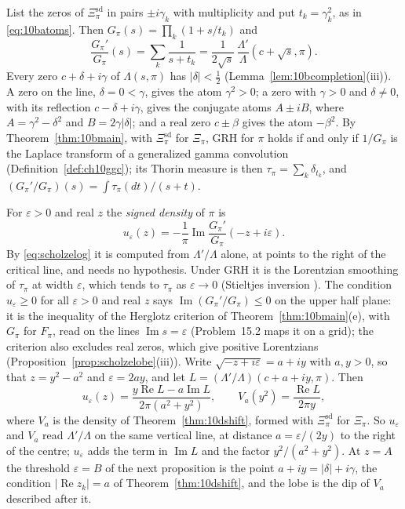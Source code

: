List the zeros of $\Xi^{\mathrm{sd}}_\pi$ in pairs $\pm i\gamma_k$ with multiplicity and put $t_k=\gamma_k^2$, as in \eqref{eq:10batoms}. Then $G_\pi(s)=\prod_k(1+s/t_k)$ and
\begin{equation}\label{eq:scholzelog}
\frac{G_\pi'}{G_\pi}(s)=\sum_k\frac1{s+t_k}=\frac1{2\sqrt s}\,\frac{\Lambda'}{\Lambda}(c+\sqrt s,\pi).
\end{equation}
Every zero $c+\delta+i\gamma$ of $\Lambda(s,\pi)$ has $|\delta|<\frac12$ (Lemma~\ref{lem:10bcompletion}(iii)). A zero on the line, $\delta=0<\gamma$, gives the atom $\gamma^2>0$; a zero with $\gamma>0$ and $\delta\ne0$, with its reflection $c-\delta+i\gamma$, gives the conjugate atoms $A\pm iB$, where $A=\gamma^2-\delta^2$ and $B=2\gamma|\delta|$; and a real zero $c\pm\beta$ gives the atom $-\beta^2$. By Theorem~\ref{thm:10bmain}, with $\Xi^{\mathrm{sd}}_\pi$ for $\Xi_\pi$, GRH for $\pi$ holds if and only if $1/G_\pi$ is the Laplace transform of a generalized gamma convolution (Definition~\ref{def:ch10ggc}); its Thorin measure is then $\tau_\pi=\sum_k\delta_{t_k}$, and $(G_\pi'/G_\pi)(s)=\int\tau_\pi(dt)/(s+t)$.

For $\varepsilon>0$ and real $z$ the \emph{signed density} of $\pi$ is
\[
u_\varepsilon(z)=-\frac1\pi\operatorname{Im}\frac{G_\pi'}{G_\pi}(-z+i\varepsilon).
\]
By \eqref{eq:scholzelog} it is computed from $\Lambda'/\Lambda$ alone, at points to the right of the critical line, and needs no hypothesis. Under GRH it is the Lorentzian smoothing of $\tau_\pi$ at width $\varepsilon$, which tends to $\tau_\pi$ as $\varepsilon\to0$ (Stieltjes inversion \cite{akhiezer1965}). The condition $u_\varepsilon\ge0$ for all $\varepsilon>0$ and real $z$ says $\operatorname{Im}(G_\pi'/G_\pi)\le0$ on the upper half plane: it is the inequality of the Herglotz criterion of Theorem~\ref{thm:10bmain}(e), with $G_\pi$ for $F_\pi$, read on the lines $\operatorname{Im}s=\varepsilon$ (Problem~15.2 maps it on a grid); the criterion also excludes real zeros, which give positive Lorentzians (Proposition~\ref{prop:scholzelobe}(iii)). Write $\sqrt{-z+i\varepsilon}=a+iy$ with $a,y>0$, so that $z=y^2-a^2$ and $\varepsilon=2ay$, and let $L=(\Lambda'/\Lambda)(c+a+iy,\pi)$. Then
\[
u_\varepsilon(z)=\frac{y\operatorname{Re}L-a\operatorname{Im}L}{2\pi(a^2+y^2)},\qquad V_a(y^2)=\frac{\operatorname{Re}L}{2\pi y},
\]
where $V_a$ is the density of Theorem~\ref{thm:10dshift}, formed with $\Xi^{\mathrm{sd}}_\pi$ for $\Xi_\pi$. So $u_\varepsilon$ and $V_a$ read $\Lambda'/\Lambda$ on the same vertical line, at distance $a=\varepsilon/(2y)$ to the right of the centre; $u_\varepsilon$ adds the term in $\operatorname{Im}L$ and the factor $y^2/(a^2+y^2)$. At $z=A$ the threshold $\varepsilon=B$ of the next proposition is the point $a+iy=|\delta|+i\gamma$, the condition $|\operatorname{Re}z_k|=a$ of Theorem~\ref{thm:10dshift}, and the lobe is the dip of $V_a$ described after it.

